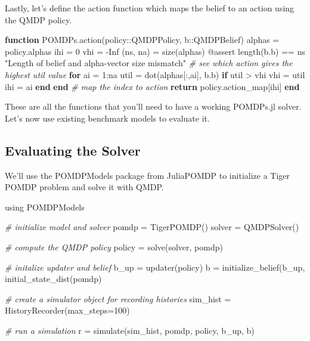 \documentclass[12pt,]{article}
\newenvironment{Shaded}{}{}
\newcommand{\KeywordTok}[1]{\textcolor[rgb]{0.00,0.44,0.13}{\textbf{{#1}}}}
\newcommand{\FloatTok}[1]{\textcolor[rgb]{0.25,0.63,0.44}{{#1}}}
\newcommand{\StringTok}[1]{\textcolor[rgb]{0.25,0.44,0.63}{{#1}}}
\newcommand{\CommentTok}[1]{\textcolor[rgb]{0.38,0.63,0.69}{\textit{{#1}}}}
\newcommand{\NormalTok}[1]{{#1}}
\begin{document}
Lastly, let's define the action function which maps the belief to an
action using the QMDP policy.

\begin{Shaded}
\begin{Highlighting}[]
\KeywordTok{function} \NormalTok{POMDPs.action(policy::QMDPPolicy, b::QMDPBelief)}
    \NormalTok{alphas = policy.alphas}
    \NormalTok{ihi = }\FloatTok{0}
    \NormalTok{vhi = -Inf}
    \NormalTok{(ns, na) = size(alphas)}
    \NormalTok{@assert length(b.b) == ns }\StringTok{"Length of belief and alpha-vector size mismatch"}
    \CommentTok{# see which action gives the highest util value}
    \KeywordTok{for} \NormalTok{ai = }\FloatTok{1}\NormalTok{:na}
        \NormalTok{util = dot(alphas[:,ai], b.b)    }
        \KeywordTok{if} \NormalTok{util > vhi}
            \NormalTok{vhi = util}
            \NormalTok{ihi = ai}
        \KeywordTok{end}
    \KeywordTok{end}
    \CommentTok{# map the index to action}
    \KeywordTok{return} \NormalTok{policy.action_map[ihi]}
\KeywordTok{end}
\end{Highlighting}
\end{Shaded}

These are all the functions that you'll need to have a working POMDPs.jl
solver. Let's now use existing benchmark models to evaluate it.

\subsection{Evaluating the Solver}\label{evaluating-the-solver}

We'll use the POMDPModels package from JuliaPOMDP to initialize a Tiger
POMDP problem and solve it with QMDP.

\begin{Shaded}
\begin{Highlighting}[]
\NormalTok{using POMDPModels}

\CommentTok{# initialize model and solver}
\NormalTok{pomdp = TigerPOMDP()}
\NormalTok{solver = QMDPSolver()}

\CommentTok{# compute the QMDP policy}
\NormalTok{policy = solve(solver, pomdp)}

\CommentTok{# initalize updater and belief}
\NormalTok{b_up = updater(policy)}
\NormalTok{b = initialize_belief(b_up, initial_state_dist(pomdp)}

\CommentTok{# create a simulator object for recording histories}
\NormalTok{sim_hist = HistoryRecorder(max_steps=}\FloatTok{100}\NormalTok{)}

\CommentTok{# run a simulation}
\NormalTok{r = simulate(sim_hist, pomdp, policy, b_up, b)}
\end{Highlighting}
\end{Shaded}
\end{document}
